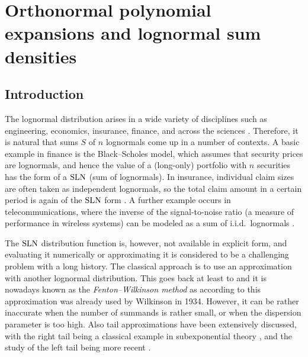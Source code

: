 \chapter{Orthonormal polynomial expansions and lognormal sum densities}

\section{Introduction}\label{S:SLN_Ortho_PDF_Intr}

The lognormal distribution arises in a wide variety of disciplines such
as engineering, economics, insurance, finance, and
across the sciences \cite{aitchison1957lognormal,crow1988lognormal,
johnson1994continuous,limpert2001log,dufresne2008}.
Therefore, it is natural that sums $S$ of $n$ lognormals come up in a
number of contexts. A basic example in finance is the
Black--Scholes
model, which assumes that security prices are %
lognormals, and hence the value of a
(long-only) portfolio with $n$ securities has the form of a $\mathrm{SLN}$ (sum of lognormals).
In  insurance, individual claim sizes are often taken as independent
lognormals, so the total claim amount in a certain period is
again of the $\mathrm{SLN}$ form \cite{ThorinWikstad1977}.
A further example occurs
in telecommunications, where
the inverse of the signal-to-noise ratio (a measure of performance in
wireless systems)
can be modeled as a sum of i.i.d.\ lognormals \citep{Gubner2006}.

The $\mathrm{SLN}$ distribution function is, however, not available
in explicit form,
and evaluating it numerically or approximating it is considered to be a challenging problem
with a long history.
The classical approach is to use an approximation
with another lognormal distribution.  This goes back at least to
\cite{fenton1960sum} and it is nowadays
known as the \emph{Fenton--Wilkinson method} as
according to \cite{Marlow1967} this approximation was already
used by Wilkinson in 1934.
However, it can be rather inaccurate when the number of summands is rather small, or
when the dispersion
parameter is too high.
Also tail approximations have been extensively discussed, with the
right tail being a classical example in subexponential theory \cite{embrechts2013modelling}, and the
study of the left tail being more recent \cite{asmussen2015exponential,tankov2015tail}.

